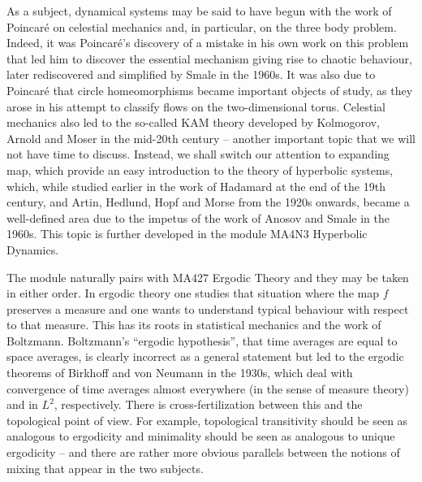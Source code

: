 \documentclass[12pt]{article}
\theoremstyle{definition}
\theoremstyle{remark}
\begin{document}
As a subject, dynamical systems may be said to have begun with the work of Poincar\'e
on celestial mechanics and, in particular, on the three body problem. Indeed, it was Poincar\'e's discovery of a mistake in his own work on this problem that led him to discover the essential mechanism giving rise to chaotic behaviour, later rediscovered and simplified by Smale in the 1960s. It was also due to Poincar\'e that circle homeomorphisms became important objects of study,
as they arose in his attempt to classify flows on the two-dimensional torus.
Celestial mechanics also led to the so-called KAM theory developed by Kolmogorov, Arnold and Moser in the mid-20th century -- another important topic that we will not have time to discuss.
Instead, we shall switch our attention to expanding map,
which provide an easy introduction to the theory of hyperbolic systems, which, while studied earlier in the work of Hadamard at the end of the 19th century,
and Artin, Hedlund, Hopf and Morse from the 1920s onwards, became a well-defined
area due to the impetus of the work of Anosov \cite{Anosov67} and Smale \cite{Smale67} in the 1960s.
This topic is further developed in the module MA4N3 Hyperbolic Dynamics.


The module naturally pairs with MA427 Ergodic Theory and they may be taken in either order.
In ergodic theory one studies that situation where the map $f$ preserves a measure and one wants to understand typical behaviour with respect to that measure. This has its roots in statistical mechanics and the work of Boltzmann. Boltzmann's ``ergodic hypothesis'', that time averages are equal to space averages, is clearly incorrect as a general statement but led to the ergodic theorems
of Birkhoff and von Neumann in the 1930s, which deal with 
convergence of time averages almost everywhere (in the sense of measure theory) and in $L^2$,
respectively.
There is cross-fertilization between this and the topological point of view. For example, 
topological transitivity should be seen as analogous to ergodicity and
minimality should 
be
seen as analogous to unique ergodicity -- and there are rather more obvious parallels between the notions of mixing that appear in the two subjects.


\end{document}
